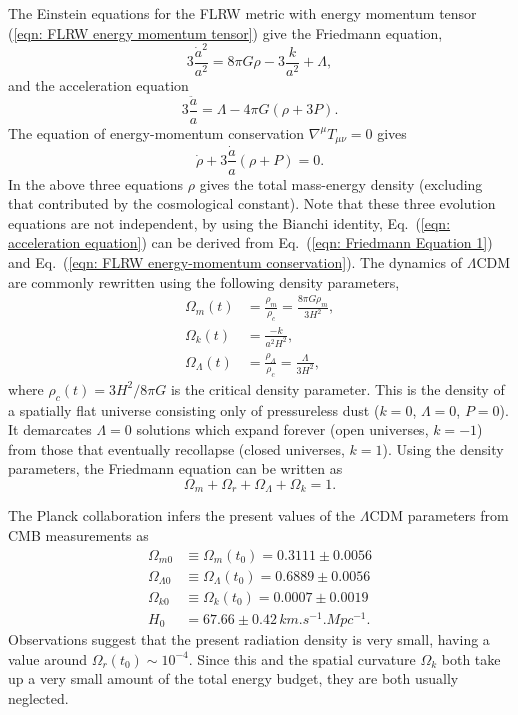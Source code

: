 \documentclass[a4paper,12pt]{report}
\renewcommand{\eqref}[1]{Eq.~({#1})}
\begin{document}
The Einstein equations for the FLRW metric with energy momentum tensor (\ref{eqn: FLRW energy momentum tensor}) give the Friedmann equation,
\begin{equation}\label{eqn: Friedmann Equation 1}
  3\frac{\dot{a}^2}{a^2}=8\pi G \rho - 3\frac{k}{a^2} + \Lambda,
\end{equation}
and the acceleration equation
\begin{equation}\label{eqn: acceleration equation}
  3\frac{\ddot{a}}{a} = \Lambda - 4\pi G \left(\rho + 3P\right).
\end{equation}
The equation of energy-momentum conservation $\nabla^\mu T_{\mu\nu}=0$ gives
\begin{equation}\label{eqn: FLRW energy-momentum conservation}
  \dot\rho + 3\frac{\dot{a}}{a}(\rho + P) = 0.
\end{equation}
In the above three equations $\rho$ gives the total mass-energy density (excluding that contributed by the cosmological constant).
Note that these three evolution equations are not independent, by using the Bianchi identity, \eqref{\ref{eqn: acceleration equation}} can be derived from \eqref{\ref{eqn: Friedmann Equation 1}} and \eqref{\ref{eqn: FLRW energy-momentum conservation}}. The dynamics of $\Lambda$CDM are commonly rewritten using the following density parameters,
\begin{align}
  \Omega_m(t) &= \frac{\rho_m}{\rho_c} = \frac{8\pi G\rho_m}{3H^2},\\
  \Omega_k(t) &= \frac{-k}{a^2 H^2}, \\
  \Omega_\Lambda(t) &= \frac{\rho_\Lambda}{\rho_c} = \frac{\Lambda}{3H^2},
\end{align}
where $\rho_c(t)=3H^2 / 8\pi G$ is the critical density parameter. This is the density of a spatially flat universe consisting only of pressureless dust ($k=0$, $\Lambda=0$, $P=0$). It demarcates $\Lambda=0$ solutions which expand forever (open universes, $k=-1$) from those that eventually recollapse (closed universes, $k=1$). Using the density parameters, the Friedmann equation can be written as
\begin{equation}
  \Omega_m + \Omega_r + \Omega_\Lambda + \Omega_k = 1.
\end{equation}

The Planck collaboration \cite{RN32} infers the present values of the $\Lambda$CDM parameters from CMB measurements as
\begin{align}
  \Omega_{m0}&\equiv\Omega_m(t_0) = 0.3111 \pm 0.0056 \\
  \Omega_{\Lambda 0}&\equiv\Omega_\Lambda(t_0) = 0.6889 \pm 0.0056 \\
  \Omega_{k0}&\equiv\Omega_k(t_0) = 0.0007 \pm 0.0019 \\
   H_0 &= 67.66 \pm 0.42\, \si{km.s^{-1}.Mpc^{-1}}.
\end{align}
Observations suggest that the present radiation density is very small, having a value around $\Omega_r (t_0) \sim 10^{-4}$. Since this and the spatial curvature $\Omega_k$ both take up a very small amount of the total energy budget, they are both usually neglected.
\end{document}
